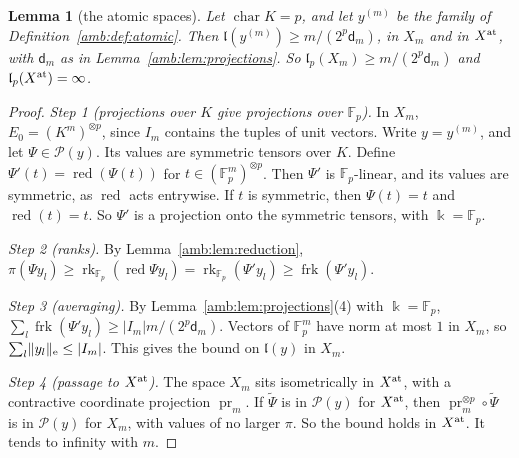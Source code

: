 \documentclass[11pt]{amsart}
\newtheorem{lemma}[theorem]{Lemma}
\theoremstyle{definition}
\theoremstyle{remark}
\numberwithin{equation}{section}
\newcommand{\F}{\mathbb F}
\newcommand{\abs}[1]{\lvert #1\rvert}
\newcommand{\norm}[1]{\lVert #1\rVert}
\theoremstyle{plain}
\theoremstyle{definition}
\theoremstyle{plain}
\begin{document}
\begin{lemma}[the atomic spaces]\label{amb:lem:atomic}
Let $\operatorname{char}K=p$, and let $y^{(m)}$ be the family of Definition~\ref{amb:def:atomic}. Then $\mathfrak l(y^{(m)})\ge m/(2^p\mathsf d_m)$, in $X_m$ and in $X^{\rm at}$, with $\mathsf d_m$ as in Lemma~\ref{amb:lem:projections}. So $\mathfrak l_p(X_m)\ge m/(2^p\mathsf d_m)$ and $\mathfrak l_p(X^{\rm at})=\infty$.
\end{lemma}

\begin{proof}
\emph{Step 1 (projections over $K$ give projections over $\F_p$).} In $X_m$, $E_0=(K^m)^{\otimes p}$, since $I_m$ contains the tuples of unit vectors. Write $y=y^{(m)}$, and let $\Psi\in\mathcal P(y)$. Its values are symmetric tensors over $K$. Define $\Psi'(t)=\operatorname{red}(\Psi(t))$ for $t\in(\F_p^m)^{\otimes p}$. Then $\Psi'$ is $\F_p$\nobreakdash-linear, and its values are symmetric, as $\operatorname{red}$ acts entrywise. If $t$ is symmetric, then $\Psi(t)=t$ and $\operatorname{red}(t)=t$. So $\Psi'$ is a projection onto the symmetric tensors, with $\Bbbk=\F_p$.

\emph{Step 2 (ranks).} By Lemma~\ref{amb:lem:reduction}, $\pi(\Psi y_l)\ge\operatorname{rk}_{\F_p}(\operatorname{red}\Psi y_l)=\operatorname{rk}_{\F_p}(\Psi'y_l)\ge\operatorname{frk}(\Psi'y_l)$.

\emph{Step 3 (averaging).} By Lemma~\ref{amb:lem:projections}(4) with $\Bbbk=\F_p$, $\sum_l\operatorname{frk}(\Psi'y_l)\ge\abs{I_m}m/(2^p\mathsf d_m)$. Vectors of $\F_p^m$ have norm at most $1$ in $X_m$, so $\sum_l\norm{y_l}_{\rm e}\le\abs{I_m}$. This gives the bound on $\mathfrak l(y)$ in $X_m$.

\emph{Step 4 (passage to $X^{\rm at}$).} The space $X_m$ sits isometrically in $X^{\rm at}$, with a contractive coordinate projection $\operatorname{pr}_m$. If $\tilde\Psi$ is in $\mathcal P(y)$ for $X^{\rm at}$, then $\operatorname{pr}_m^{\otimes p}\circ\tilde\Psi$ is in $\mathcal P(y)$ for $X_m$, with values of no larger $\pi$. So the bound holds in $X^{\rm at}$. It tends to infinity with $m$.
\end{proof}
\end{document}
